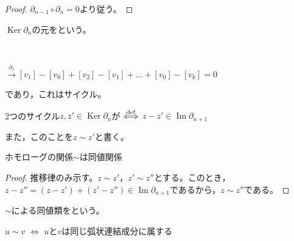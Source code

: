 \documentclass[uplatex]{jsarticle}
\DeclareMathOperator{\Image}{Im}
\DeclareMathOperator{\Kernel}{Ker}
\begin{document}
\begin{proof}
  $\partial_{n-1} \circ \partial_{n} = 0$より従う。
\end{proof}

\begin{teigi}[サイクル]
  $\Kernel \partial_{n}$の元をという。
\end{teigi}

\begin{rei}[サイクルのイメージ]　\\

  $\xrightarrow{\partial_{1}} [v_{1}] - [v_{0}] + [v_{2}] - [v_{1}] + \dots + [v_{0}] - [v_{k}] = 0$
  
  であり，これはサイクル。
\end{rei}

\begin{teigi}[ホモローグ]
  2つのサイクル$z, z' \in \Kernel \partial_{n}$が $\overset{\mathrm{def}}{\Longleftrightarrow}$ $z - z' \in \Image \partial_{n+1}$

  また，このことを$z \sim z'$と書く。
\end{teigi}

\begin{hodai}
  ホモローグの関係$\sim$は同値関係
\end{hodai}

\begin{proof}
  推移律のみ示す。$z \sim z'$，$z' \sim z''$とする。このとき，$z - z'' = (z - z') + (z' - z'') \in \Image \partial_{n+1}$であるから，$z \sim z''$である。
\end{proof}

$\sim$による同値類をという。

\begin{rei}[ホモローグのイメージ]
\end{rei}

\begin{hodai}
  $u \sim v$ $\Longleftrightarrow$ $u$と$v$は同じ弧状連結成分に属する
\end{hodai}
\end{document}
